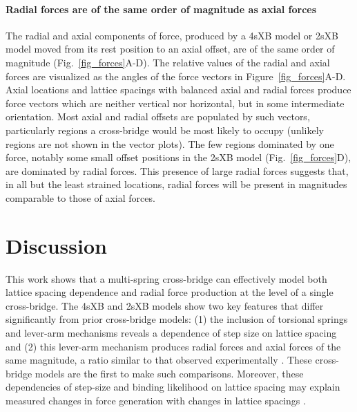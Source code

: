 \documentclass[]{article}
\begin{document}
\paragraph{Radial forces are of the same order of magnitude as axial forces} %
The radial and axial components of force, produced by a 4sXB model or 2sXB model moved from its rest position to an axial offset, are of the same order of magnitude (Fig.~\ref{fig_forces}A-D). 
The relative values of the radial and axial forces are visualized as the angles of the force vectors in Figure~\ref{fig_forces}A-D. 
Axial locations and lattice spacings with balanced axial and radial forces produce force vectors which are neither vertical nor horizontal, but in some intermediate orientation.
Most axial and radial offsets are populated by such vectors, particularly regions a cross-bridge would be most likely to occupy (unlikely regions are not shown in the vector plots). 
The few regions dominated by one force, notably some small offset positions in the 2sXB model (Fig.~\ref{fig_forces}D), are dominated by radial forces.
This presence of large radial forces suggests that, in all but the least strained locations, radial forces will be present in magnitudes comparable to those of axial forces. 



\section*{Discussion} %

This work shows that a multi-spring cross-bridge can effectively model both lattice spacing dependence and radial force production at the level of a single cross-bridge. 
The 4sXB and 2sXB models show two key features that differ significantly from prior cross-bridge models: (1) the inclusion of torsional springs and lever-arm mechanisms reveals a dependence of step size on lattice spacing and (2) this lever-arm mechanism produces radial forces and axial forces of the same magnitude, a ratio similar to that observed experimentally \citep{Cecchi1990, Brenner1991}. 
These cross-bridge models are the first to make such comparisons.
Moreover, these dependencies of step-size and binding likelihood on lattice spacing may explain measured changes in force generation with changes in lattice spacings  \citep{Millman1998}. 
\end{document}
